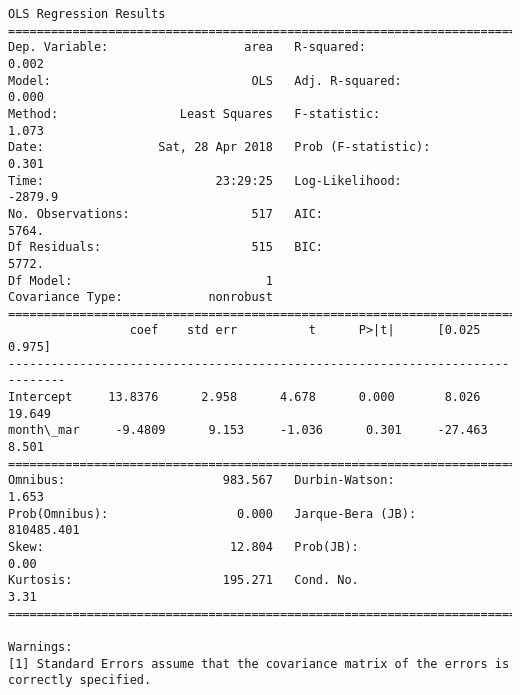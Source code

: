 \documentclass[11pt]{article}
\begin{document}
\begin{Verbatim}[commandchars=\\\{\}]
                            OLS Regression Results                            
==============================================================================
Dep. Variable:                   area   R-squared:                       0.002
Model:                            OLS   Adj. R-squared:                  0.000
Method:                 Least Squares   F-statistic:                     1.073
Date:                Sat, 28 Apr 2018   Prob (F-statistic):              0.301
Time:                        23:29:25   Log-Likelihood:                -2879.9
No. Observations:                 517   AIC:                             5764.
Df Residuals:                     515   BIC:                             5772.
Df Model:                           1                                         
Covariance Type:            nonrobust                                         
==============================================================================
                 coef    std err          t      P>|t|      [0.025      0.975]
------------------------------------------------------------------------------
Intercept     13.8376      2.958      4.678      0.000       8.026      19.649
month\_mar     -9.4809      9.153     -1.036      0.301     -27.463       8.501
==============================================================================
Omnibus:                      983.567   Durbin-Watson:                   1.653
Prob(Omnibus):                  0.000   Jarque-Bera (JB):           810485.401
Skew:                          12.804   Prob(JB):                         0.00
Kurtosis:                     195.271   Cond. No.                         3.31
==============================================================================

Warnings:
[1] Standard Errors assume that the covariance matrix of the errors is correctly specified.



\end{Verbatim}
\end{document}
